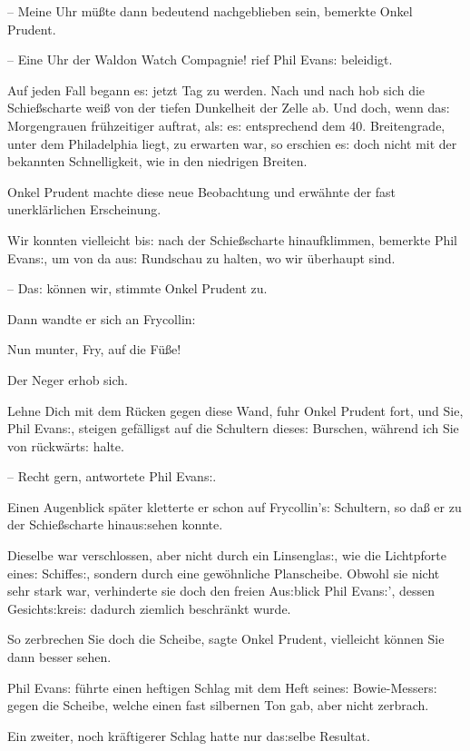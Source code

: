 \documentclass[oneside,12pt]{book}
\newcommand{\s}{s:}
\begin{document}
-- Meine Uhr m\"u{\ss}te dann bedeutend nachgeblieben sein, bemerkte
Onkel Prudent.

-- Eine Uhr der Waldon Watch Compagnie!{\grqq} rief Phil Evan{\s}
beleidigt.

Auf jeden Fall begann e{\s} jetzt Tag zu werden. Nach und nach hob
sich die Schie{\ss}scharte wei{\ss} von der tiefen Dunkelheit der
Zelle ab. Und doch, wenn da{\s} Morgengrauen fr\"uhzeitiger auftrat,
al{\s} e{\s} entsprechend dem 40. Breitengrade, unter dem
Philadelphia liegt, zu erwarten war, so erschien e{\s} doch nicht mit
der bekannten Schnelligkeit, wie in den niedrigen Breiten.

Onkel Prudent machte diese neue Beobachtung und erw\"ahnte der fast
unerkl\"arlichen Erscheinung.

{\glqq}Wir konnten vielleicht bi{\s} nach der Schie{\ss}scharte
hinaufklimmen{\grqq}, bemerkte Phil Evan{\s}, um von da au{\s}
Rundschau zu halten, wo wir \"uberhaupt sind.

-- Da{\s} k\"onnen wir,{\grqq} stimmte Onkel Prudent zu.

Dann wandte er sich an Frycollin:

{\glqq}Nun munter, Fry, auf die F\"u{\ss}e!{\grqq}

Der Neger erhob sich.

{\glqq}Lehne Dich mit dem R\"ucken gegen diese Wand, fuhr Onkel
Prudent fort, und Sie, Phil Evan{\s}, steigen gef\"alligst auf die
Schultern diese{\s} Burschen, w\"ahrend ich Sie von r\"uckw\"art{\s}
halte.

-- Recht gern,{\grqq} antwortete Phil Evan{\s}.

Einen Augenblick sp\"ater kletterte er schon auf Frycollin'{\s}
Schultern, so da{\ss} er zu der Schie{\ss}scharte hinau{\s}sehen
konnte.

Dieselbe war verschlossen, aber nicht durch ein Linsengla{\s}, wie
die Lichtpforte eine{\s} Schiffe{\s}, sondern durch eine
gew\"ohnliche Planscheibe. Obwohl sie nicht sehr stark war,
verhinderte sie doch den freien Au{\s}blick Phil Evan{\s}', dessen
Gesicht{\s}krei{\s} dadurch ziemlich beschr\"ankt wurde.

{\glqq}So zerbrechen Sie doch die Scheibe, sagte Onkel Prudent,
vielleicht k\"onnen Sie dann besser sehen.{\grqq}

Phil Evan{\s} f\"uhrte einen heftigen Schlag mit dem Heft seine{\s}
Bowie-Messer{\s} gegen die Scheibe, welche einen fast silbernen Ton
gab, aber nicht zerbrach.

Ein zweiter, noch kr\"aftigerer Schlag hatte nur da{\s}selbe Resultat.
\end{document}
